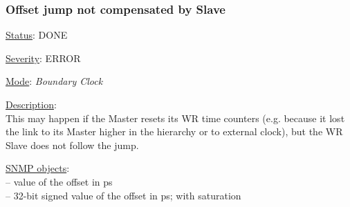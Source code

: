 \subsubsection{\bf Offset jump not compensated by Slave}
		\label{fail:timing:offset_jump}
		\begin{pck_descr}
			\item [] \underline{Status}: DONE
			\item [] \underline{Severity}: ERROR
			\item [] \underline{Mode}: \emph{Boundary Clock}
			\item [] \underline{Description}:\\
				This may happen if the Master resets its WR time counters (e.g. because
        it lost the link to its Master higher in the hierarchy or to external
				clock), but the WR Slave does not follow the jump.
			\item [] \underline{SNMP objects}:\\
        {\footnotesize
				 -- value of the offset in ps\\
				 -- 32-bit signed value of the offset in ps; with saturation\\
				\\
				 \\
				 \\
         }
		\end{pck_descr}

